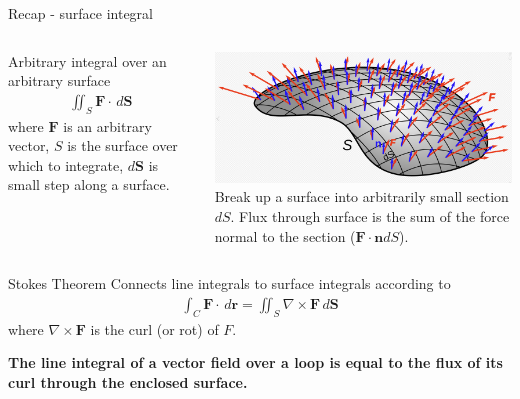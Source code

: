 \documentclass[10pt,aspectratio=169,usenames,dvipsnames]{beamer}
\begin{document}
\begin{frame}{Recap - surface integral}
\begin{columns}
\begin{column}{0.5\textwidth}
Arbitrary integral over an arbitrary surface
\begin{gather}
    \iint_S \textbf{F} \cdot \,d\textbf{S}
\end{gather}
where $\textbf{F}$ is an arbitrary vector, $S$ is the surface over which to integrate, $d\textbf{S}$ is small step along a surface.
\end{column}
\begin{column}{0.5\textwidth}
\includegraphics[width=0.8\linewidth]{2023StAndrews/Screenshot from 2023-03-13 14-36-16.png} \\
Break up a surface into arbitrarily small section $dS$. Flux through surface is the sum of the force normal to the section ($\textbf{F}\cdot \textbf{n} dS$).
\end{column}
\end{columns}
\end{frame}

\begin{frame}{Stokes Theorem}
Connects line integrals to surface integrals according to
\begin{gather}
    \int_C \textbf{F} \cdot \,d\textbf{r} = \iint_S \nabla \times \textbf{F} \,d\textbf{S}
\end{gather}
where $\nabla \times \textbf{F}$ is the curl (or rot) of $F$.

\textbf{The line integral of a vector field over a loop is equal to the flux of its curl through the enclosed surface.}
\end{frame}
\end{document}
